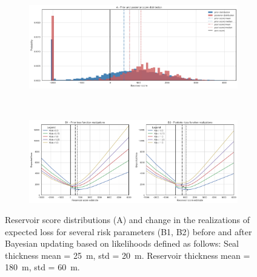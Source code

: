 	\begin{figure}[h]
		\begin{subfigure}{1\textwidth}
			\centering
			\includegraphics[width=1\linewidth]{Figures/update_moderate2.png}
		\end{subfigure}%
		\\
		\begin{subfigure}{1\textwidth}
			\centering
			\includegraphics[width=1\linewidth]{Figures/update_moderate3.png}
		\end{subfigure}
		\caption{Reservoir score distributions (A) and change in the realizations of expected loss for several risk parameters (B1, B2) before and after Bayesian updating based on likelihoods defined as follows: Seal thickness mean = 25~m, std = 20~m. Reservoir thickness mean = 180~m, std = 60~m.}
		\label{fig:update_moderate2_3}
	\end{figure}
	
